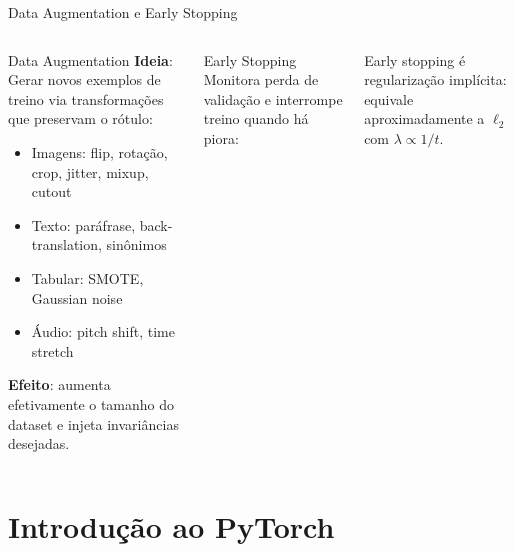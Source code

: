 \documentclass[7pt, aspectratio=169,10pt]{beamer}
\begin{document}
\begin{frame}{Data Augmentation e Early Stopping}
\begin{columns}[T]
\begin{block}{Data Augmentation}
\small
\textbf{Ideia}: Gerar novos exemplos de treino via transformações que preservam o rótulo:
\begin{itemize}
  \item Imagens: flip, rotação, crop, jitter, mixup, cutout
  \item Texto: paráfrase, back-translation, sinônimos
  \item Tabular: SMOTE, Gaussian noise
  \item Áudio: pitch shift, time stretch
\end{itemize}
\vspace{4pt}
\textbf{Efeito}: aumenta efetivamente o tamanho do dataset e injeta invariâncias desejadas.
\end{block}
\begin{block}{Early Stopping}
\small
Monitora perda de validação e interrompe treino quando há piora:
\end{block}
\begin{exampleblock}{}
\small
Early stopping é regularização implícita: equivale aproximadamente a $\ell_2$ com $\lambda \propto 1/t$.
\end{exampleblock}
\end{columns}
\end{frame}

\section{Introdução ao PyTorch}
\end{document}
